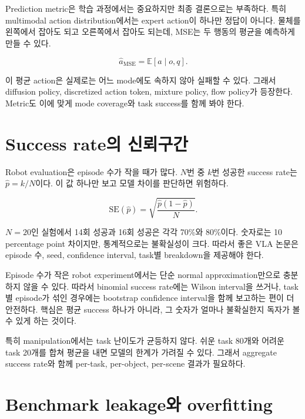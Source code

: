 Prediction metric은 학습 과정에서는 중요하지만 최종 결론으로는 부족하다. 특히 multimodal action distribution에서는 expert action이 하나만 정답이 아니다. 물체를 왼쪽에서 잡아도 되고 오른쪽에서 잡아도 되는데, MSE는 두 행동의 평균을 예측하게 만들 수 있다.

\begin{equation}
  \hat{a}_{\mathrm{MSE}}
  =
  \mathbb{E}
  \left[
    a \mid o,q
  \right].
\end{equation}

이 평균 action은 실제로는 어느 mode에도 속하지 않아 실패할 수 있다. 그래서 diffusion policy, discretized action token, mixture policy, flow policy가 등장한다. Metric도 이에 맞게 mode coverage와 task success를 함께 봐야 한다.

\section{Success rate의 신뢰구간}

Robot evaluation은 episode 수가 작을 때가 많다. $N$번 중 $k$번 성공한 success rate는 $\hat{p}=k/N$이다. 이 값 하나만 보고 모델 차이를 판단하면 위험하다.

\begin{equation}
  \mathrm{SE}(\hat{p})
  =
  \sqrt{
    \frac{
      \hat{p}(1-\hat{p})
    }{N}
  }.
\end{equation}

$N=20$인 실험에서 14회 성공과 16회 성공은 각각 70\%와 80\%이다. 숫자로는 10 percentage point 차이지만, 통계적으로는 불확실성이 크다. 따라서 좋은 VLA 논문은 episode 수, seed, confidence interval, task별 breakdown을 제공해야 한다.

Episode 수가 작은 robot experiment에서는 단순 normal approximation만으로 충분하지 않을 수 있다. 따라서 binomial success rate에는 Wilson interval을 쓰거나, task별 episode가 섞인 경우에는 bootstrap confidence interval을 함께 보고하는 편이 더 안전하다. 핵심은 평균 success 하나가 아니라, 그 숫자가 얼마나 불확실한지 독자가 볼 수 있게 하는 것이다.

특히 manipulation에서는 task 난이도가 균등하지 않다. 쉬운 task 80개와 어려운 task 20개를 합쳐 평균을 내면 모델의 한계가 가려질 수 있다. 그래서 aggregate success rate와 함께 per-task, per-object, per-scene 결과가 필요하다.

\section{Benchmark leakage와 overfitting}

